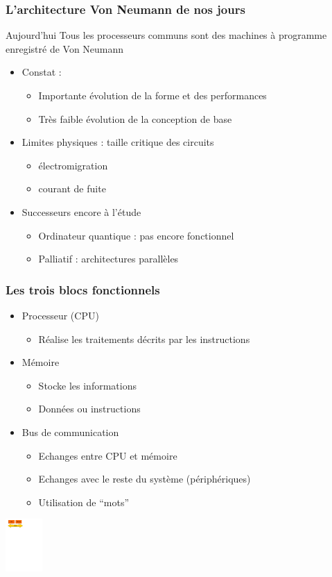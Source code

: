 \begin{frame}
\frametitle{L'architecture Von Neumann de nos jours}
\begin{block}{Aujourd'hui}
Tous les processeurs communs sont des machines à programme enregistré de Von Neumann
\end{block}

\begin{itemize}
\item <1-> Constat :
\begin{itemize}
\item Importante évolution de la forme et des performances
\item Très faible évolution de la conception de base
\end{itemize}
\item <2-> Limites physiques : taille critique des circuits
\begin{itemize}
\item électromigration
\item courant de fuite
\end{itemize}
\item <3-> Successeurs encore à l'étude 
\begin{itemize}
\item Ordinateur quantique : pas encore fonctionnel
\item Palliatif : architectures parallèles
\end{itemize}
\end{itemize}
\end{frame}


\begin{frame}
\frametitle{Les trois blocs fonctionnels}
\begin{itemize}
\item Processeur (CPU)
\begin{itemize}
\item Réalise les traitements décrits par les instructions
\end{itemize}
\item Mémoire
\begin{itemize}
\item Stocke les informations
\item Données ou instructions
\end{itemize}
\item Bus de communication
\begin{itemize}
\item Echanges entre CPU et mémoire
\item Echanges avec le reste du système (périphériques)
\item Utilisation de “mots”
\end{itemize}
\end{itemize}
\includegraphics[height=2cm]{../illustration/vn_cpu_mem_bus.pdf}
\end{frame}


